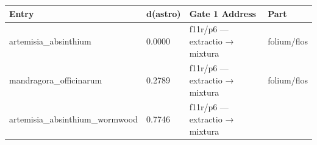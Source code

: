 \begin{longtable}[]{@{}llll@{}}
\toprule
\begin{minipage}[b]{0.22\columnwidth}\raggedright
Entry\strut
\end{minipage} & \begin{minipage}[b]{0.22\columnwidth}\raggedright
d(astro)\strut
\end{minipage} & \begin{minipage}[b]{0.22\columnwidth}\raggedright
Gate 1 Address\strut
\end{minipage} & \begin{minipage}[b]{0.22\columnwidth}\raggedright
Part\strut
\end{minipage}\tabularnewline
\midrule
\endhead
\begin{minipage}[t]{0.22\columnwidth}\raggedright
artemisia\_absinthium\strut
\end{minipage} & \begin{minipage}[t]{0.22\columnwidth}\raggedright
0.0000\strut
\end{minipage} & \begin{minipage}[t]{0.22\columnwidth}\raggedright
f11r/p6 --- extractio → mixtura\strut
\end{minipage} & \begin{minipage}[t]{0.22\columnwidth}\raggedright
folium/flos\strut
\end{minipage}\tabularnewline
\begin{minipage}[t]{0.22\columnwidth}\raggedright
mandragora\_officinarum\strut
\end{minipage} & \begin{minipage}[t]{0.22\columnwidth}\raggedright
0.2789\strut
\end{minipage} & \begin{minipage}[t]{0.22\columnwidth}\raggedright
f11r/p6 --- extractio → mixtura\strut
\end{minipage} & \begin{minipage}[t]{0.22\columnwidth}\raggedright
folium/flos\strut
\end{minipage}\tabularnewline
\begin{minipage}[t]{0.22\columnwidth}\raggedright
artemisia\_absinthium\_wormwood\strut
\end{minipage} & \begin{minipage}[t]{0.22\columnwidth}\raggedright
0.7746\strut
\end{minipage} & \begin{minipage}[t]{0.22\columnwidth}\raggedright
f11r/p6 --- extractio → mixtura\strut

\end{minipage}
\end{longtable}
